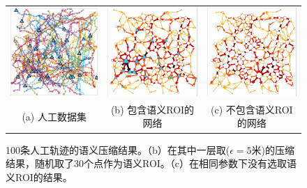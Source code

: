 \tabcolsep=0pt
\begin{figure}[!t]
\centering
\begin{tabular}{ccc}
\includegraphics[width=50mm]{pics/synthetic_raw.pdf}&
\includegraphics[width=50mm]{pics/syn_with_visualization.pdf}&
\includegraphics[width=50mm]{pics/syn_without_visulization.pdf}\\
(a) 人工数据集 & (b) 包含语义ROI的网络 & (c) 不包含语义ROI的网络  \\
\end{tabular}
\caption{100条人工轨迹的语义压缩结果。（b）在其中一层取($\epsilon=5$米)的压缩结果，随机取了30个点作为语义ROI。（c）在相同参数下没有选取语义ROI的结果。}
\label{fig:syntheticData} 
\end{figure}

